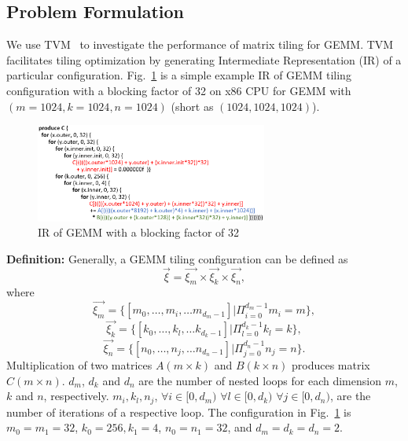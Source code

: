 \subsection{Problem Formulation}
We use TVM~\cite{Chen18} to investigate the performance of matrix tiling for GEMM. TVM facilitates tiling optimization by generating Intermediate Representation (IR) of a particular configuration. Fig.~\ref{fig:gemm_ir} is a simple example IR of GEMM tiling configuration with a blocking factor of 32 on x86 CPU for GEMM with $(m=1024, k=1024, n=1024)$ (short as $(1024,1024,1024)$).
\begin{figure}[htb]
    \centering
    \includegraphics[width=3in]{3_GEMM_backgrounds/gemm_ir.png}
    \caption{IR of GEMM with a blocking factor of 32}
    \label{fig:gemm_ir}
\end{figure}

\noindent
\textbf{Definition:}
Generally, a GEMM tiling configuration can be defined as 
\begin{equation}
    \overrightarrow{\xi} = \overrightarrow{\xi_m} \times \overrightarrow{\xi_k} \times \overrightarrow{\xi_n},
\end{equation}
where
\begin{equation}
     \overrightarrow{\xi_m} =\{ \left[m_0,\ldots,m_i, \ldots m_{d_m-1} \right] |  \Pi_{i=0}^{d_m-1} m_i=m \},
\end{equation}
\begin{equation}
     \overrightarrow{\xi_k} =\{ \left[k_0,\ldots,k_l, \ldots k_{d_k-1} \right] |  \Pi_{l=0}^{d_k-1} k_l=k \},
\end{equation}
\begin{equation}
     \overrightarrow{\xi_n} =\{ \left[n_0,\ldots,n_j, \ldots n_{d_n-1} \right] |  \Pi_{j=0}^{d_n-1} n_j=n \}.
\end{equation}
Multiplication of two matrices $A(m\times k)$ and $B(k\times n)$ produces matrix $C(m\times n)$. $d_m$, $d_k$ and $d_n$ are the number of nested loops for each dimension $m$, $k$ and $n$, respectively.  $m_i, k_l, n_j$, $\forall i \in [0, d_m)$ $\forall l \in [0, d_k)$ $\forall j \in [0, d_n)$, are the number of iterations of a respective loop. The configuration in Fig.~\ref{fig:gemm_ir} is $m_0=m_1=32$, $k_0=256, k_1=4$, $n_0=n_1=32$, and $d_m=d_k=d_n=2$.

